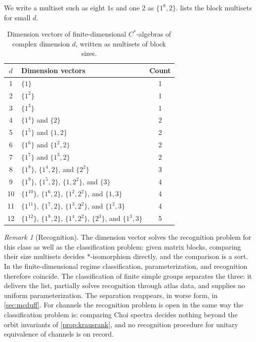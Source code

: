 \documentclass[11pt,letterpaper]{article}
\theoremstyle{definition}
\theoremstyle{remark}
\newtheorem{remark}[theorem]{Remark}
\begin{document}
We write a multiset such as eight $1$s and one $2$ as $\{1^8, 2\}$.  lists the block multisets for small $d$.

\begin{table}[ht]
\centering
\caption{Dimension vectors of finite-dimensional $C^*$-algebras of complex dimension $d$, written as multisets of block sizes.}
\label{tab:counts}
\small
\begin{tabularx}{\textwidth}{@{}c Y c@{}}
\toprule
$d$ & Dimension vectors & Count \\
 & $\{1\}$ & 1 \\
2 & $\{1^2\}$ & 1 \\
3 & $\{1^3\}$ & 1 \\
4 & $\{1^4\}$ and $\{2\}$ & 2 \\
5 & $\{1^5\}$ and $\{1, 2\}$ & 2 \\
6 & $\{1^6\}$ and $\{1^2, 2\}$ & 2 \\
7 & $\{1^7\}$ and $\{1^3, 2\}$ & 2 \\
8 & $\{1^8\}$, $\{1^4, 2\}$, and $\{2^2\}$ & 3 \\
9 & $\{1^9\}$, $\{1^5, 2\}$, $\{1, 2^2\}$, and $\{3\}$ & 4 \\
10 & $\{1^{10}\}$, $\{1^6, 2\}$, $\{1^2, 2^2\}$, and $\{1, 3\}$ & 4 \\
11 & $\{1^{11}\}$, $\{1^7, 2\}$, $\{1^3, 2^2\}$, and $\{1^2, 3\}$ & 4 \\
12 & $\{1^{12}\}$, $\{1^8, 2\}$, $\{1^4, 2^2\}$, $\{2^3\}$, and $\{1^3, 3\}$ & 5 \\
\bottomrule
\end{tabularx}
\end{table}

\begin{remark}[Recognition]
\label{rem:recognition}
The dimension vector solves the recognition problem for this class as well as the classification problem: given matrix blocks, comparing their size multisets decides $*$-isomorphism directly, and the comparison is a sort. In the finite-dimensional regime classification, parameterization, and recognition therefore coincide. The classification of finite simple groups separates the three: it delivers the list, partially solves recognition through atlas data, and supplies no uniform parameterization. The separation reappears, in worse form, in \cref{sec:mcduff}. For channels the recognition problem is open in the same way the classification problem is: comparing Choi spectra decides nothing beyond the orbit invariants of \cref{prop:krausrank}, and no recognition procedure for unitary equivalence of channels is on record.
\end{remark}
\end{document}
